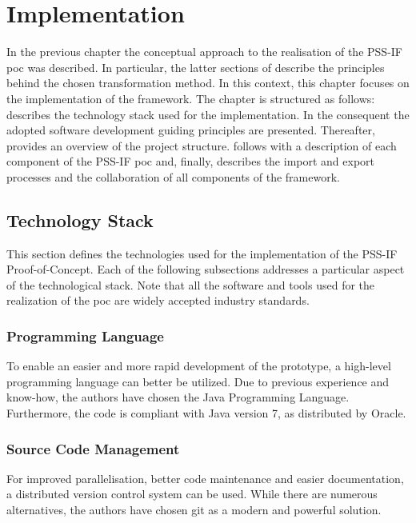 \chapter{Implementation}
\label{chap:impl}

In the previous chapter the conceptual approach to the realisation of the PSS-IF \gls{poc} was described. In particular, the latter sections of  describe the principles behind the chosen transformation method. In this context, this chapter focuses on the implementation of the framework. The chapter is structured as follows:  describes the technology stack used for the implementation. In the consequent  the adopted software development guiding principles are presented. Thereafter,  provides an overview of the project structure.  follows with a description of each component of the PSS-IF \gls{poc} and, finally,  describes the import and export processes and the collaboration of all components of the framework.

\section{Technology Stack}
\label{sec:impl:technology}

This section defines the technologies used for the implementation of the PSS-IF Proof-of-Concept. Each of the following subsections addresses a particular aspect of the technological stack. Note that all the software and tools used for the realization of the \gls{poc} are widely accepted industry standards.

\subsection{Programming Language}

To enable an easier and more rapid development of the prototype, a high-level programming language can better be utilized. Due to previous experience and know-how, the authors have chosen the Java Programming Language\cite{ref:java}. Furthermore, the code is compliant with Java version 7, as distributed by Oracle. 

\subsection{Source Code Management}

For improved parallelisation, better code maintenance and easier documentation, a distributed version control system can be used. While there are numerous alternatives, the authors have chosen git \cite{ref:git} as a modern and powerful solution.

